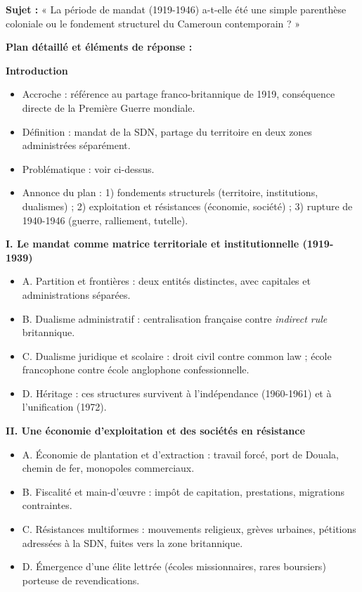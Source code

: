 \documentclass[11pt]{article}
\begin{document}
\begin{exoresolu}
\textbf{Sujet :} « La période de mandat (1919-1946) a-t-elle été une simple parenthèse coloniale ou le fondement structurel du Cameroun contemporain ? »

\textbf{Plan détaillé et éléments de réponse :}

\textbf{Introduction}
\begin{itemize}
\item Accroche : référence au partage franco-britannique de 1919, conséquence directe de la Première Guerre mondiale.
\item Définition : mandat de la SDN, partage du territoire en deux zones administrées séparément.
\item Problématique : voir ci-dessus.
\item Annonce du plan : 1) fondements structurels (territoire, institutions, dualismes) ; 2) exploitation et résistances (économie, société) ; 3) rupture de 1940-1946 (guerre, ralliement, tutelle).
\end{itemize}

\textbf{I. Le mandat comme matrice territoriale et institutionnelle (1919-1939)}
\begin{itemize}
\item A. Partition et frontières : deux entités distinctes, avec capitales et administrations séparées.
\item B. Dualisme administratif : centralisation française contre \emph{indirect rule} britannique.
\item C. Dualisme juridique et scolaire : droit civil contre common law ; école francophone contre école anglophone confessionnelle.
\item D. Héritage : ces structures survivent à l'indépendance (1960-1961) et à l'unification (1972).
\end{itemize}

\textbf{II. Une économie d'exploitation et des sociétés en résistance}
\begin{itemize}
\item A. Économie de plantation et d'extraction : travail forcé, port de Douala, chemin de fer, monopoles commerciaux.
\item B. Fiscalité et main-d'œuvre : impôt de capitation, prestations, migrations contraintes.
\item C. Résistances multiformes : mouvements religieux, grèves urbaines, pétitions adressées à la SDN, fuites vers la zone britannique.
\item D. Émergence d'une élite lettrée (écoles missionnaires, rares boursiers) porteuse de revendications.
\end{itemize}


\end{exoresolu}
\end{document}

